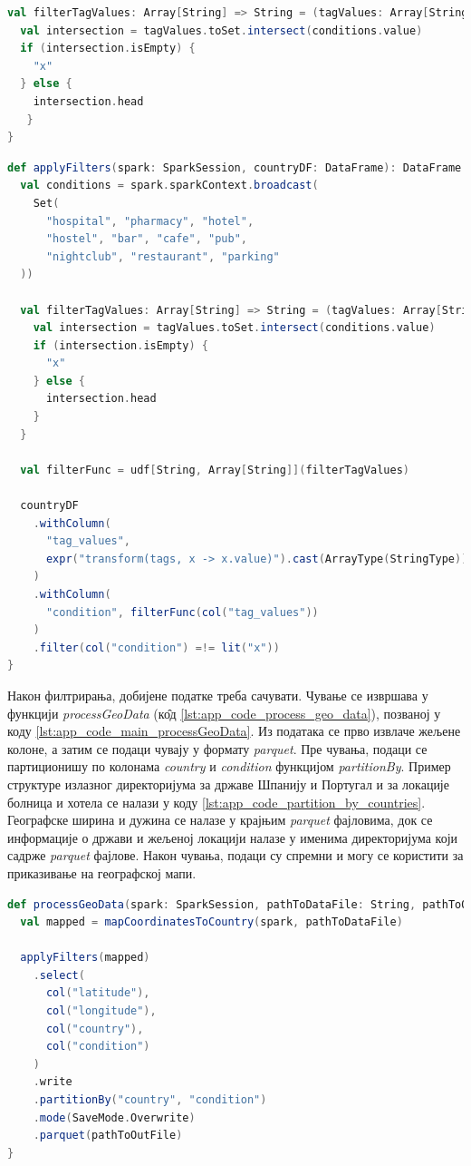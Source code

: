 \documentclass[12pt,oneside]{memoir}
\begin{document}
\begin{lstlisting}[caption={Функција која одређује да ли је локација жељеног типа}, language=Scala, label={lst:app_code_filter_tag_vals_func}]
val filterTagValues: Array[String] => String = (tagValues: Array[String]) => {
  val intersection = tagValues.toSet.intersect(conditions.value)
  if (intersection.isEmpty) {
    "x"
  } else {
    intersection.head
   }
}
\end{lstlisting}

\begin{lstlisting}[caption={Функција \textit{applyFilters}}, language=Scala, label={lst:app_code_apply_filters}]
def applyFilters(spark: SparkSession, countryDF: DataFrame): DataFrame = {
  val conditions = spark.sparkContext.broadcast(
    Set(
      "hospital", "pharmacy", "hotel",
      "hostel", "bar", "cafe", "pub",
      "nightclub", "restaurant", "parking"
  ))

  val filterTagValues: Array[String] => String = (tagValues: Array[String]) => {
    val intersection = tagValues.toSet.intersect(conditions.value)
    if (intersection.isEmpty) {
      "x"
    } else {
      intersection.head
    }
  }

  val filterFunc = udf[String, Array[String]](filterTagValues)

  countryDF
    .withColumn(
      "tag_values",
      expr("transform(tags, x -> x.value)").cast(ArrayType(StringType))
    )
    .withColumn(
      "condition", filterFunc(col("tag_values"))
    )
    .filter(col("condition") =!= lit("x"))
}
\end{lstlisting}

Након филтрирања, добијене податке треба сачувати. Чување се извршава у функцији \textit{processGeoData} (к\^{о}д \ref{lst:app_code_process_geo_data}), позваној у коду \ref{lst:app_code_main_processGeoData}. Из података се прво извлаче жељене колоне, а затим се подаци чувају у формату \textit{parquet}. Пре чувања, подаци се партиционишу по колонама \textit{country} и \textit{condition} функцијом \textit{partitionBy}. Пример структуре излазног директоријума за државе Шпанију и Португал и за локације болница и хотела се налази у коду \ref{lst:app_code_partition_by_countries}. Географске ширина и дужина се налазе у крајњим \textit{parquet} фајловима, док се информације о држави и жељеној локацији налазе у именима директоријума који садрже \textit{parquet} фајлове. Након чувања, подаци су спремни и могу се користити за приказивање на географској мапи.

\begin{lstlisting}[caption={Функција \textit{processGeoData}}, language=Scala, label={lst:app_code_process_geo_data}]
def processGeoData(spark: SparkSession, pathToDataFile: String, pathToOutFile: String): Unit = {
  val mapped = mapCoordinatesToCountry(spark, pathToDataFile)

  applyFilters(mapped)
    .select(
      col("latitude"),
      col("longitude"),
      col("country"),
      col("condition")
    )
    .write
    .partitionBy("country", "condition")
    .mode(SaveMode.Overwrite)
    .parquet(pathToOutFile)
}
\end{lstlisting}
\end{document}
